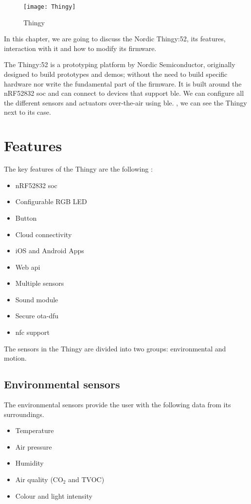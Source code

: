 \begin{figure}[hbt!]
	\centering
	\texttt{[image: Thingy]}
	\caption{Thingy}
	\label{fig:thingy}
\end{figure}
In this chapter, we are going to discuss the Nordic Thingy:52, its features,  interaction with it and how to modify its firmware.

The Thingy:52 is a prototyping platform by Nordic Semiconductor, originally designed to build prototypes and demos; without the need to build specific hardware nor write the fundamental part of the firmware. It is built around the nRF52832 \gls{soc} and can connect to devices that support \gls{ble}. We can configure all the different sensors and actuators over-the-air using \gls{ble}. , we can see the Thingy next to its case.

\section{Features} \label{sc:features}
The key features of the Thingy are the following \cite{DocFeatures}:
\begin{itemize}
	\item nRF52832 \gls{soc}
	\item Configurable RGB LED
	\item Button
	\item Cloud connectivity
	\item iOS and Android Apps
	\item Web \bt \gls{api}
	\item Multiple sensors
	\item Sound module
	\item Secure \gls{ota-dfu}
	\item \gls{nfc} support
\end{itemize}
The sensors in the Thingy are divided into two groups: environmental and motion.

\subsection{Environmental sensors}\label{sc:features_env}
The environmental sensors provide the user with the following data from its surroundings.
\begin{itemize}
	\item Temperature
	\item Air pressure
	\item Humidity
	\item Air quality (CO$_2$ and TVOC)
	\item Colour and light intensity
\end{itemize}
